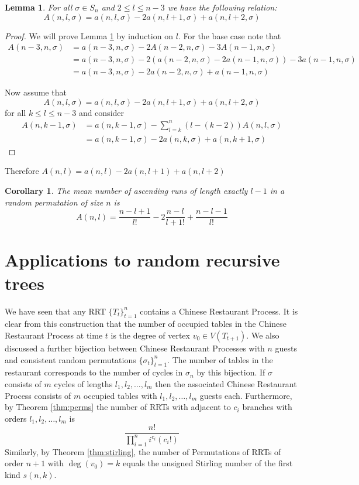 \documentclass[oneside]{book} %
\newtheorem{lem}[thm]{Lemma}
\newtheorem{cor}[thm]{Corollary}
\theoremstyle{definition}
\numberwithin{equation}{section}
\begin{document}
\begin{lem}\label{lem:induction}
 For all $\sigma \in S_n$ and $ 2 \leq l \leq n-3 $ we have the following relation:
 \[
  A(n,l,\sigma) = a(n,l,\sigma) -2 a(n,l+1,\sigma) + a(n,l+2,\sigma)  
 \]
\end{lem}
\begin{proof}
 We will prove Lemma \ref{lem:induction} by induction on $l$.  For the base case note that 
\begin{align}
  A(n-3,n,\sigma) &= a(n-3,n,\sigma) -  2A(n-2,n,\sigma) - 3A(n-1,n,\sigma) \\
  &= a(n-3,n,\sigma) -  2(a(n-2,n,\sigma) - 2a(n-1,n,\sigma)) -  3a(n-1,n,\sigma) \\
  &= a(n-3,n,\sigma) -  2a(n-2,n,\sigma) + a(n-1,n,\sigma) 
\end{align}

Now assume that 
 \[
  A(n,l,\sigma) = a(n,l,\sigma) -2 a(n,l+1,\sigma) + a(n,l+2,\sigma)  
 \]
for all $k \leq l \leq n-3$ and consider 
\begin{align}
 A(n,k-1,\sigma) &= a(n,k-1,\sigma) - \sum_{l = k}^n(l-(k-2))A(n,l,\sigma)  \\
 &= a(n,k-1,\sigma) - 2a(n,k,\sigma) + a(n,k+1,\sigma)
\end{align}
\end{proof}

Therefore $A(n,l) = a(n,l) - 2a(n,l+1) + a(n,l+2)$

\begin{cor}
The mean number of ascending runs of length \emph{exactly} $l-1$ in a random permutation of size $n$ is
\[A(n,l) = \frac{n-l+1}{l!} - 2\frac{n-l}{l+1!} + \frac{n-l-1}{l!}\] 
\end{cor}



\section{Applications to random recursive trees}\label{sec:Applications}
We have seen that any RRT $\{T_t\}_{t=1}^{n}$ contains a Chinese Restaurant Process.  It is clear from this construction that
the number of occupied tables in the Chinese Restaurant Process at time $t$ is the degree of vertex $v_0 \in V(T_{t+1})$.  We 
also discussed a further bijection between Chinese Restaurant Processes with $n$ guests and consistent random permutations 
$\{\sigma_t\}_{t=1}^{n}$. The number of tables in the restaurant corresponds to the number of cycles in $\sigma_n$ by this
bijection. If $\sigma$ consists of $m$ cycles of lengths $l_1,l_2,\dots,l_m$ then the associated Chinese Restaurant Process
consists of $m$ occupied tables with $l_1,l_2,\dots,l_m$ guests each. Furthermore, by Theorem \ref{thm:perms} the number of RRTs with adjacent to $c_i$ branches with orders $l_1,l_2,\dots,l_m$ is  
 \[
   \frac{n!}{\prod_{i=1}^{n}i^{c_{i}}(c_i!)}
 \]  
Similarly, by Theorem \ref{thm:stirling}, the number of Permutations of RRTs of order $n+1$ with $\deg(v_0) = k $ equals the unsigned Stirling number of the first kind $s(n,k)$.
\end{document}
